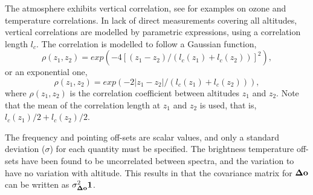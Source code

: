 The atmosphere exhibits vertical correlation, see \citet{eriksson:stati:02} for
examples on ozone and temperature correlations. In lack of direct measurements
covering all altitudes, vertical correlations are modelled by parametric
expressions, using a correlation length $l_c$. The correlation is modelled to
follow a Gaussian function,
\begin{equation}
  \label{eq:corr:gau}
  \rho(z_1,z_2) = exp\left(-4[(z_1-z_2)/(l_c(z_1)+l_c(z_2))]^2\right),
\end{equation}
or an exponential one,
\begin{equation}
  \label{eq:corr:exp}
  \rho(z_1,z_2) = exp\left(-2\left|z_1-z_2\right|/(l_c(z_1)+l_c(z_2))\right),
\end{equation}
where $\rho(z_1,z_2)$ is the correlation coefficient between altitudes $z_1$
and $z_2$. Note that the mean of the correlation length at $z_1$ and $z_2$ is
used, that is,  $l_c(z_1)/2+l_c(z_2)/2$.

The frequency and pointing off-sets are scalar values, and only a standard
deviation ($\sigma$) for each quantity must be specified. The brightness
temperature off-sets have been found to be uncorrelated between spectra, and
the variation to have no variation with altitude. This results in that the
covariance matrix for $\mathbf{\Delta\mathbf{o}}$ can be written as
$\sigma_{\mathbf{\Delta\mathbf{o}}}^2\mathbf{1}$.

